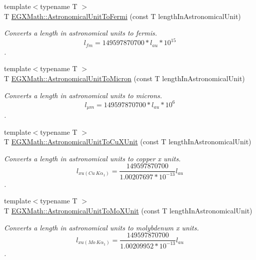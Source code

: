 \begin{DoxyCompactItemize}
{\footnotesize template$<$typename T $>$ }\\T \mbox{\hyperlink{group___e_g_x_math-_conversions-_length_conversions-_astronomical-_astronomical_unit-_non-_s_i_gacdf3c6bc0a49c0602d659161e6910bec}{E\+G\+X\+Math\+::\+Astronomical\+Unit\+To\+Fermi}} (const T length\+In\+Astronomical\+Unit)
\begin{DoxyCompactList}\small\item\em Converts a length in astronomical units to fermis. \[ l_{fm}=149597870700 * l_{au} * 10^{15} \]. \end{DoxyCompactList}\item 
{\footnotesize template$<$typename T $>$ }\\T \mbox{\hyperlink{group___e_g_x_math-_conversions-_length_conversions-_astronomical-_astronomical_unit-_non-_s_i_ga9fd03b0356095288ca7476121e45042d}{E\+G\+X\+Math\+::\+Astronomical\+Unit\+To\+Micron}} (const T length\+In\+Astronomical\+Unit)
\begin{DoxyCompactList}\small\item\em Converts a length in astronomical units to microns. \[ l_{\mu m}=149597870700 * l_{au} * 10^{6} \]. \end{DoxyCompactList}\item 
{\footnotesize template$<$typename T $>$ }\\T \mbox{\hyperlink{group___e_g_x_math-_conversions-_length_conversions-_astronomical-_astronomical_unit-_non-_s_i_ga00eedd6324f9a6b31af3ae3fa14ca644}{E\+G\+X\+Math\+::\+Astronomical\+Unit\+To\+Cu\+X\+Unit}} (const T length\+In\+Astronomical\+Unit)
\begin{DoxyCompactList}\small\item\em Converts a length in astronomical units to copper x units. \[ l_{xu(Cu\ K\alpha_1)}= \frac{149597870700}{1.00207697*10^{-13}} l_{au} \]. \end{DoxyCompactList}\item 
{\footnotesize template$<$typename T $>$ }\\T \mbox{\hyperlink{group___e_g_x_math-_conversions-_length_conversions-_astronomical-_astronomical_unit-_non-_s_i_ga8b3dc85e14d6129ebfa2f6336d63bf9c}{E\+G\+X\+Math\+::\+Astronomical\+Unit\+To\+Mo\+X\+Unit}} (const T length\+In\+Astronomical\+Unit)
\begin{DoxyCompactList}\small\item\em Converts a length in astronomical units to molybdenum x units. \[ l_{xu(Mo\ K\alpha_1)}=\frac{149597870700}{1.00209952*10^{-13}} l_{au} \]. \end{DoxyCompactList}\item 

\end{DoxyCompactItemize}
